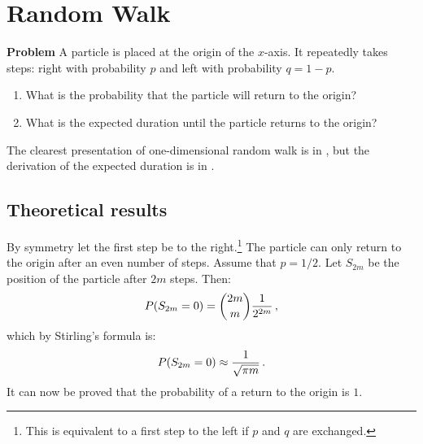 
\section{Random Walk}\label{s.walk}

\textbf{Problem} A particle is placed at the origin of the $x$-axis. It repeatedly takes steps: right with probability $p$ and left with probability $q=1-p$.
\begin{enumerate}
\item What is the probability that the particle will return to the origin?
\item What is the expected duration until the particle returns to the origin?
\end{enumerate}
\begin{center}
\end{center}
The clearest presentation of one-dimensional random walk is in \cite{border}, but the derivation of the expected duration is in \cite{privault}.

\subsection{Theoretical results}

By symmetry let the first step be to the right.\footnote{This is equivalent to a first step to the left if $p$ and $q$ are exchanged.} The particle can only return to the origin after an even number of steps. Assume that $p=1/2$. Let $S_{2m}$ be the position of the particle after $2m$ steps. Then:
\[
P(S_{2m}=0) = \displaystyle{2m \choose m}\displaystyle\frac{1}{2^{2m}}\,,
\]
which by Stirling's formula is:
\[
P(S_{2m}=0) \approx \displaystyle\frac{1}{\sqrt{\pi m}}\,.
\]
It can now be proved that the probability of a return to the origin is $1$.

